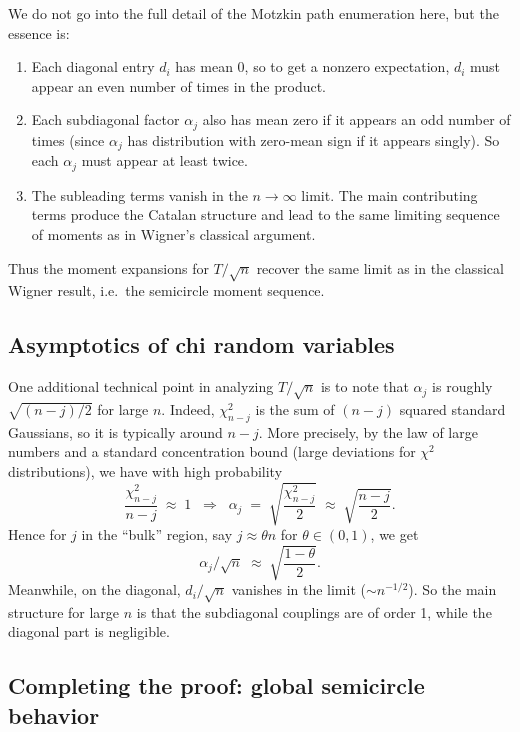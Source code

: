 \documentclass[letterpaper,11pt,oneside,reqno]{article}
\numberwithin{equation}{section}
\theoremstyle{definition}
\begin{document}
We do not go into the full detail of the Motzkin path enumeration here, but the essence is:
\begin{enumerate}
\item Each diagonal entry $d_i$ has mean 0, so to get a nonzero expectation, $d_i$ must appear an even number of times in the product.  
\item Each subdiagonal factor $\alpha_j$ also has mean zero if it appears an odd number of times (since $\alpha_j$ has distribution with zero-mean sign if it appears singly).  So each $\alpha_j$ must appear at least twice. 
\item The subleading terms vanish in the $n\to\infty$ limit. The main contributing terms produce the Catalan structure and lead to the same limiting sequence of moments as in Wigner’s classical argument.  
\end{enumerate}
Thus the moment expansions for $T/\sqrt{n}$ recover the same limit as in the classical Wigner result, i.e.\ the semicircle moment sequence. 

\subsection{Asymptotics of chi random variables}
\label{sub:chi-asymptotics}

One additional technical point in analyzing $T/\sqrt{n}$ is to note that $\alpha_j$ is roughly $\sqrt{(n-j)/2}$ for large $n$.  Indeed, $\chi^2_{n-j}$ is the sum of $(n-j)$ squared standard Gaussians, so it is typically around $n-j$.  More precisely, by the law of large numbers and a standard concentration bound (large deviations for $\chi^2$ distributions), we have with high probability
\[
  \frac{\chi^2_{n-j}}{n-j} \;\approx\;1
  \;\;\Longrightarrow\;\;
  \alpha_j \;=\;\sqrt{\frac{\chi^2_{n-j}}{2}}
  \;\approx\;\sqrt{\frac{n-j}{2}}.
\]
Hence for $j$ in the “bulk” region, say $j\approx\theta n$ for $\theta\in(0,1)$, we get 
\[
  \alpha_j/\sqrt{n}\;\approx\;\sqrt{\frac{1-\theta}{2}}.
\]
Meanwhile, on the diagonal, $d_i/\sqrt{n}$ vanishes in the limit ($\sim n^{-1/2}$).  So the main structure for large $n$ is that the subdiagonal couplings are of order 1, while the diagonal part is negligible.

\subsection{Completing the proof: global semicircle behavior}
\end{document}
